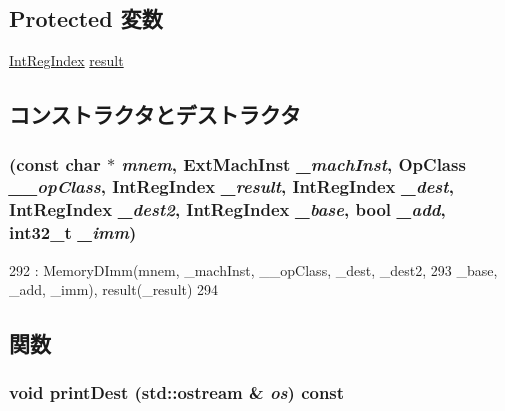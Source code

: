 \subsection*{Protected 変数}
\begin{DoxyCompactItemize}
\item 
\hyperlink{namespaceArmISA_ae64680ba9fb526106829d6bf92fc791b}{IntRegIndex} \hyperlink{classArmISA_1_1MemoryExDImm_a43f8ecc8130e5285e0ae2134151d6d6a}{result}
\end{DoxyCompactItemize}


\subsection{コンストラクタとデストラクタ}
\hypertarget{classArmISA_1_1MemoryExDImm_a057471464ba49b260b6c0950550ffe1a}{
\subsubsection[{MemoryExDImm}]{ (const char $\ast$ {\em mnem}, \/  {\bf ExtMachInst} {\em \_\-machInst}, \/  OpClass {\em \_\-\_\-opClass}, \/  {\bf IntRegIndex} {\em \_\-result}, \/  {\bf IntRegIndex} {\em \_\-dest}, \/  {\bf IntRegIndex} {\em \_\-dest2}, \/  {\bf IntRegIndex} {\em \_\-base}, \/  bool {\em \_\-add}, \/  int32\_\-t {\em \_\-imm})}}
\label{classArmISA_1_1MemoryExDImm_a057471464ba49b260b6c0950550ffe1a}



\begin{DoxyCode}
292         : MemoryDImm(mnem, _machInst, __opClass, _dest, _dest2,
293                      _base, _add, _imm), result(_result)
294     {}
\end{DoxyCode}


\subsection{関数}
\hypertarget{classArmISA_1_1MemoryExDImm_adee5df6e5d6b0c498363aabda42431fa}{
\subsubsection[{printDest}]{\setlength{\rightskip}{0pt plus 5cm}void printDest (std::ostream \& {\em os}) const}}
\label{classArmISA_1_1MemoryExDImm_adee5df6e5d6b0c498363aabda42431fa}


